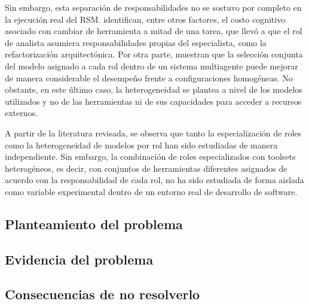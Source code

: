 Sin embargo, esta separación de responsabilidades no se sostuvo por completo en la ejecución real del RSM. \textcite{fernandezyfernandez2025rsm} identifican, entre otros factores, el costo cognitivo asociado con cambiar de herramienta a mitad de una tarea, que llevó a que el rol de analista asumiera responsabilidades propias del especialista, como la refactorización arquitectónica. Por otra parte, \textcite{feng2025heteroswarms} muestran que la selección conjunta del modelo asignado a cada rol dentro de un sistema multiagente puede mejorar de manera considerable el desempeño frente a configuraciones homogéneas. No obstante, en este último caso, la heterogeneidad se plantea a nivel de los modelos utilizados y no de las herramientas ni de sus capacidades para acceder a recursos externos.

A partir de la literatura revisada, se observa que tanto la especialización de roles como la heterogeneidad de modelos por rol han sido estudiadas de manera independiente. Sin embargo, la combinación de roles especializados con toolsets heterogéneos, es decir, con conjuntos de herramientas diferentes asignados de acuerdo con la responsabilidad de cada rol, no ha sido estudiada de forma aislada como variable experimental dentro de un entorno real de desarrollo de software.


\subsection{Planteamiento del problema}

\subsection{Evidencia del problema}

\subsection{Consecuencias de no resolverlo}
